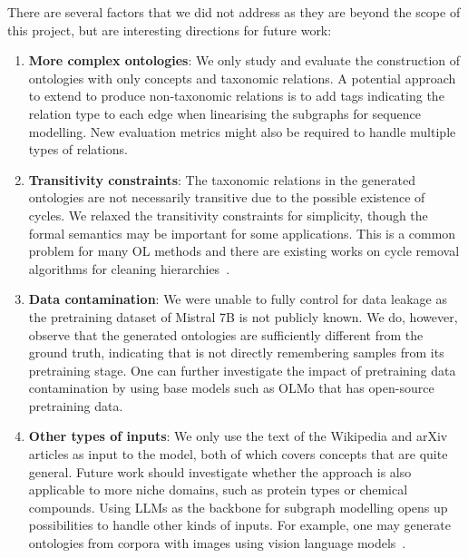 There are several factors that we did not address as they are beyond the scope of this project, but are interesting directions for future work:
\begin{enumerate}
    \item \textbf{More complex ontologies}: We only study and evaluate the construction of ontologies with only concepts and taxonomic relations. A potential approach to extend \name to produce non-taxonomic relations is to add tags indicating the relation type to each edge when linearising the subgraphs for sequence modelling. New evaluation metrics might also be required to handle multiple types of relations.
    \item \textbf{Transitivity constraints}: The taxonomic relations in the generated ontologies are not necessarily transitive due to the possible existence of cycles. We relaxed the transitivity constraints for simplicity, though the formal semantics may be important for some applications. This is a common problem for many OL methods and there are existing works on cycle removal algorithms for cleaning hierarchies~\cite{sun2017breaking,zesch2007analysis}.
    \item \textbf{Data contamination}: We were unable to fully control for data leakage as the pretraining dataset of Mistral 7B is not publicly known. We do, however, observe that the generated ontologies are sufficiently different from the ground truth, indicating that \name is not directly remembering samples from its pretraining stage. One can further investigate the impact of pretraining data contamination by using base models such as OLMo \cite{OLMo} that has open-source pretraining data.
    \item \textbf{Other types of inputs}: We only use the text of the Wikipedia and arXiv articles as input to the model, both of which covers concepts that are quite general. Future work should investigate whether the approach is also applicable to more niche domains, such as protein types or chemical compounds. Using LLMs as the backbone for subgraph modelling opens up possibilities to handle other kinds of inputs. For example, one may generate ontologies from corpora with images using vision language models~\cite{donahue2015long}.
\end{enumerate}
